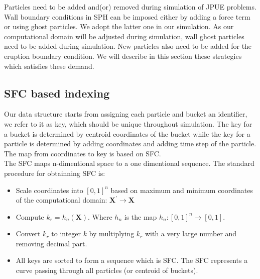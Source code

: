 \documentclass[conference,compsoc]{IEEEtran}
\begin{document}
Particles need to be added and(or) removed during simulation of JPUE problems. Wall boundary conditions in SPH can be imposed either by adding a force term or using ghost particles. We adopt the latter one in our simulation. As our computational domain will be adjusted during simulation, wall ghost particles need to be added during simulation. New particles also need to be added for the eruption boundary condition. 
We will describe in this section these strategies which satisfies these demand.
\subsection{SFC based indexing}
Our data structure starts from assigning each particle and bucket an identifier, we refer to it as key, which should be unique throughout simulation. The key for a bucket is determined by centroid coordinates of the bucket while the key for a particle is determined by adding coordinates and adding time step of the particle. The map from coordinates to key is based on SFC.\\
The SFC \cite{sagan2012space} maps n-dimentional space to a one dimentional sequence. The standard procedure for obtainning SFC is: 
\begin{itemize}
\item Scale coordinates into $[0,1]^n $ based on maximum and minimum coordinates of the computational domain: $\textbf{X}^\prime \rightarrow \textbf{X}$
\item Compute $k_r = h_n(\textbf{X})$. Where $h_n$ is the map $h_n: [0,1]^n \rightarrow [0,1]$. 
\item Convert $k_r$ to integer $k$ by multiplying $k_r$ with a very large number and removing decimal part.
\item All keys are sorted to form a sequence which is SFC. The SFC represents a curve passing through all particles (or centroid of buckets).
\end{itemize}
\end{document}
